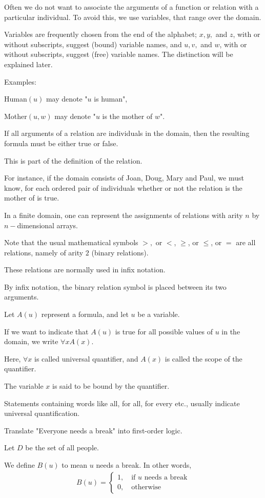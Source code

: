\documentclass{article}
\begin{document}
Often we do not want to associate the arguments of a function or relation with a particular individual. To avoid this, we use variables, that range over the domain.

Variables are frequently chosen from the end of the alphabet; $x,y,$ and $z$, with or without subscripts, suggest (bound) variable names, and $u,v,$ and $w$, with or without subscripts, suggest (free) variable names. The distinction will be explained later.

Examples:

Human$(u)$ may denote "$u$ is human",

Mother$(u,w)$ may denote "$u$ is the mother of $w$".

If all arguments of a relation are individuals in the domain, then the resulting formula must be either true or false.

This is part of the definition of the relation.

For instance, if the domain consists of Joan, Doug, Mary and Paul, we must know, for each ordered pair of individuals whether or not the relation is the mother of is true.

In a finite domain, one can represent the assignments of relations with arity $n$ by $n-$dimensional arrays.

Note that the usual mathematical symbols $>,$ or $<$, $\ge$, or $\le$, or $=$ are all relations, namely of arity $2$ (binary relations).

These relations are normally used in infix notation.

By infix notation, the binary relation symbol is placed between its two arguments.

Let $A(u)$ represent a formula, and let $u$ be a variable.

If we want to indicate that $A(u)$ is true for all possible values of $u$ in the domain, we write $\forall x A(x)$.

Here, $\forall x$ is called universal quantifier, and $A(x)$ is called the scope of the quantifier.

The variable $x$ is said to be bound by the quantifier.

Statements containing words like all, for all, for every etc., usually indicate universal quantification.

Translate "Everyone needs a break" into first-order logic.

Let $D$ be the set of all people.

We define $B(u)$ to mean $u$ needs a break. In other words,
\begin{align*}
    B(u) = \begin{cases}
        1, \quad \text{if } u \text{ needs a break} \\
        0, \quad \text{otherwise}
    \end{cases}
\end{align*}
\end{document}
